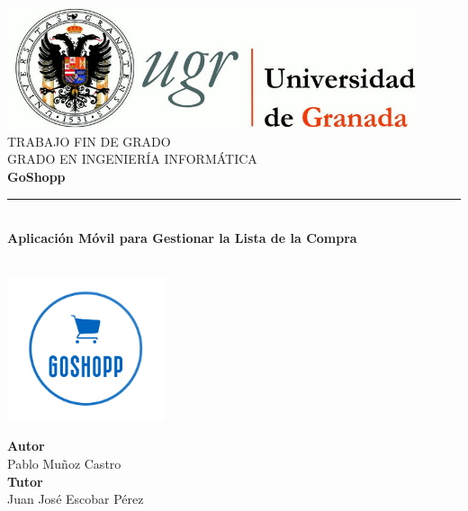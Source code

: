 \begin{titlepage} 

\newlength{\centeroffset}
\setlength{\centeroffset}{-0.5\oddsidemargin}
\addtolength{\centeroffset}{0.5\evensidemargin}
\thispagestyle{empty}

\noindent\hspace*{\centeroffset}
\begin{minipage}{\textwidth}

\centering
\includegraphics[width=0.9\textwidth]{imagenes/logos/logo_ugr.jpg}\\[1.4cm]

\textsc{\Large TRABAJO FIN DE GRADO\\[0.2cm]}
\textsc{GRADO EN INGENIERÍA INFORMÁTICA}\\[1cm]

{\Huge\bfseries GoShopp\\}
\noindent\rule[-1ex]{\textwidth}{3pt}\\[3.5ex]
{\large\bfseries Aplicación Móvil para Gestionar la Lista de la Compra}
\end{minipage}\\[1cm]

\centering
\includegraphics[width=0.35\textwidth]{imagenes/logos/logo.png}

\vspace{1cm}
\noindent\hspace*{\centeroffset}\begin{minipage}{\textwidth}
\centering

\textbf{Autor}\\ {Pablo Muñoz Castro}\\[2.5ex]
\textbf{Tutor}\\ {Juan José Escobar Pérez}\\[1cm]


\end{minipage}
\end{titlepage}
